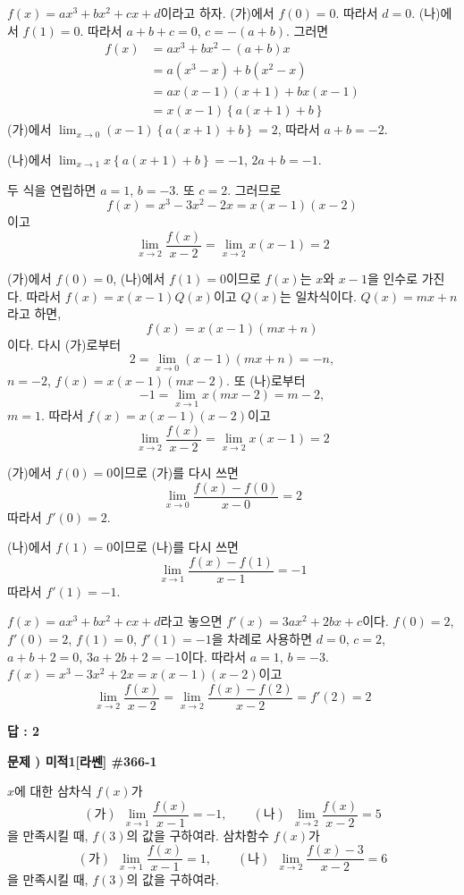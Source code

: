 \documentclass[a4paper]{oblivoir}
\newcounter{num}
\newcommand\prob[1]
{\bigskip\par\noindent\stepcounter{num} \textbf{문제 \thenum) #1}\par\noindent}
\newcommand\vs[1]{\vspace{60pt}}
\begin{document}
\begin{mdframed}[frametitle=<풀이1> 인수분해를 통한 방법]
\(f(x)=ax^3+bx^2+cx+d\)이라고 하자.
(가)에서 \(f(0)=0\). 따라서 \(d=0\).
(나)에서 \(f(1)=0\). 따라서 \(a+b+c=0\), \(c=-(a+b)\). 그러면
\begin{align*}
f(x)
&=ax^3+bx^2-(a+b)x\\
&=a(x^3-x)+b(x^2-x)\\
&=ax(x-1)(x+1)+bx(x-1)\\
&=x(x-1)\left\{a(x+1)+b\right\}
\end{align*}
(가)에서
\(\displaystyle\lim_{x\to0}(x-1)\left\{a(x+1)+b\right\}=2\),
따라서 \(a+b=-2\).\medskip\par\noindent
(나)에서
\(\displaystyle\lim_{x\to1}x\left\{a(x+1)+b\right\}=-1\),
\(2a+b=-1\).\medskip\par\noindent
두 식을 연립하면 \(a=1\), \(b=-3\).
또 \(c=2\).
그러므로
\[f(x)=x^3-3x^2-2x=x(x-1)(x-2)\]
이고
\[\lim_{x\to2}\frac{f(x)}{x-2}=\lim_{x\to2}x(x-1)=2\]
\end{mdframed}

\begin{mdframed}[frametitle=<풀이2> 인수정리를 사용한 방법]
(가)에서 \(f(0)=0\), (나)에서 \(f(1)=0\)이므로 \(f(x)\)는 \(x\)와 \(x-1\)을 인수로 가진다.
따라서 \(f(x)=x(x-1)Q(x)\)이고 \(Q(x)\)는 일차식이다. \(Q(x)=mx+n\)라고 하면,
\[f(x)=x(x-1)(mx+n)\]
이다.
다시 (가)로부터
\[2=\lim_{x\to0}(x-1)(mx+n)=-n,\]
\(n=-2\), \(f(x)=x(x-1)(mx-2)\).
또 (나)로부터
\[-1=\lim_{x\to1}x(mx-2)=m-2,\]
\(m=1\).
따라서 \(f(x)=x(x-1)(x-2)\)이고
\[\lim_{x\to2}\frac{f(x)}{x-2}=\lim_{x\to2}x(x-1)=2\]
\end{mdframed}

\begin{mdframed}[frametitle=<풀이3> 미분계수를 사용한 방법]
(가)에서 \(f(0)=0\)이므로 (가)를 다시 쓰면
\[\lim_{x\to0}\frac{f(x)-f(0)}{x-0}=2\]
따라서 \(f'(0)=2\).

(나)에서 \(f(1)=0\)이므로 (나)를 다시 쓰면
\[\lim_{x\to1}\frac{f(x)-f(1)}{x-1}=-1\]
따라서 \(f'(1)=-1\).

\(f(x)=ax^3+bx^2+cx+d\)라고 놓으면 \(f'(x)=3ax^2+2bx+c\)이다.
\(f(0)=2\), \(f'(0)=2\), \(f(1)=0\), \(f'(1)=-1\)을 차례로 사용하면
\(d=0\), \(c=2\), \(a+b+2=0\), \(3a+2b+2=-1\)이다.
따라서 \(a=1\), \(b=-3\). \(f(x)=x^3-3x^2+2x=x(x-1)(x-2)\)이고
\[\lim_{x\to2}\frac{f(x)}{x-2}=\lim_{x\to2}\frac{f(x)-f(2)}{x-2}=f'(2)=2\]
\end{mdframed}
{\par
\raggedleft\textbf{답 : 2}
\par}\bigskip

%
\prob{미적1[라쎈] \#366-1}
\(x\)에 대한 삼차식 \(f(x)\)가
\[
(가)\:\:\lim_{x\to1}\frac{f(x)}{x-1}=-1,\qquad
(나)\:\:\lim_{x\to2}\frac{f(x)}{x-2}=5
\]
을 만족시킬 때, \(f(3)\)의 값을 구하여라.
\vs

%
\prob{미적1[라쎈] \#366-2}
삼차함수 \(f(x)\)가
\[
(가)\:\:\lim_{x\to1}\frac{f(x)}{x-1}=1,\qquad
(나)\:\:\lim_{x\to2}\frac{f(x)-3}{x-2}=6
\]
을 만족시킬 때, \(f(3)\)의 값을 구하여라.
\end{document}
